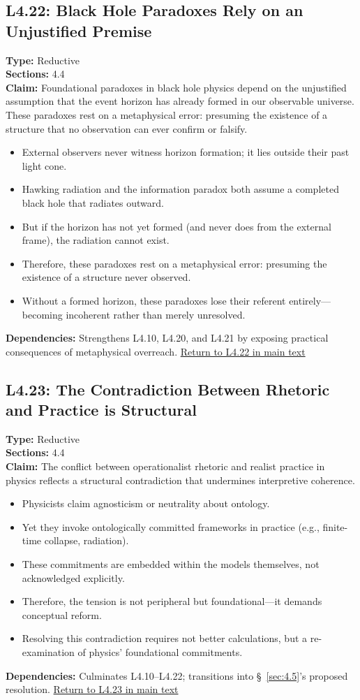 \documentclass[12pt]{book}
\newcommand{\returnlink}[1]{\hyperref[logic:#1]{Return to #1 in main text}\xspace}
\begin{document}
\subsection*{L4.22: Black Hole Paradoxes Rely on an Unjustified Premise}
\label{appendix:L4.22}
\textbf{Type:} Reductive \\
\textbf{Sections:} 4.4 \\
\textbf{Claim:} Foundational paradoxes in black hole physics depend on the unjustified assumption that the event horizon has already formed in our observable universe. These paradoxes rest on a metaphysical error: presuming the existence of a structure that no observation can ever confirm or falsify.
\begin{itemize}
  \item External observers never witness horizon formation; it lies outside their past light cone.
  \item Hawking radiation and the information paradox both assume a completed black hole that radiates outward.
  \item But if the horizon has not yet formed (and never does from the external frame), the radiation cannot exist.
  \item Therefore, these paradoxes rest on a metaphysical error: presuming the existence of a structure never observed.
  \item Without a formed horizon, these paradoxes lose their referent entirely---becoming incoherent rather than merely unresolved.
\end{itemize}
\textbf{Dependencies:} Strengthens L4.10, L4.20, and L4.21 by exposing practical consequences of metaphysical overreach.
\returnlink{L4.22}

\subsection*{L4.23: The Contradiction Between Rhetoric and Practice is Structural}
\label{appendix:L4.23}
\textbf{Type:} Reductive \\
\textbf{Sections:} 4.4 \\
\textbf{Claim:} The conflict between operationalist rhetoric and realist practice in physics reflects a structural contradiction that undermines interpretive coherence.
\begin{itemize}
  \item Physicists claim agnosticism or neutrality about ontology.
  \item Yet they invoke ontologically committed frameworks in practice (e.g., finite-time collapse, radiation).
  \item These commitments are embedded within the models themselves, not acknowledged explicitly.
  \item Therefore, the tension is not peripheral but foundational---it demands conceptual reform.
  \item Resolving this contradiction requires not better calculations, but a re-examination of physics' foundational commitments.
\end{itemize}
\textbf{Dependencies:} Culminates L4.10–L4.22; transitions into \S~\ref{sec:4.5}'s proposed resolution.
\returnlink{L4.23}
\end{document}
